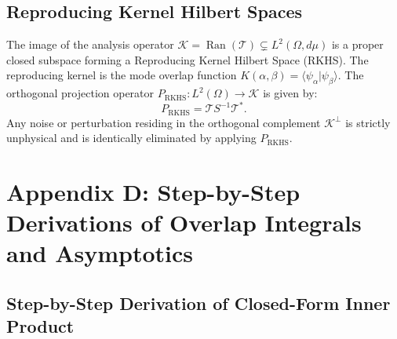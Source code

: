 \documentclass{optica-article}
\begin{document}
\subsection{Reproducing Kernel Hilbert Spaces}

The image of the analysis operator $\mathcal{K} = \operatorname{Ran}(\mathcal{T}) \subsetneq L^2(\Omega, d\mu)$ is a proper closed subspace forming a Reproducing Kernel Hilbert Space (RKHS). The reproducing kernel is the mode overlap function $K(\alpha, \beta) = \langle \psi_\alpha | \psi_\beta \rangle$. The orthogonal projection operator $P_{\text{RKHS}}: L^2(\Omega) \to \mathcal{K}$ is given by:
\begin{equation}
P_{\text{RKHS}} = \mathcal{T} S^{-1} \mathcal{T}^*.
\end{equation}
Any noise or perturbation residing in the orthogonal complement $\mathcal{K}^\perp$ is strictly unphysical and is identically eliminated by applying $P_{\text{RKHS}}$.

\section{Appendix D: Step-by-Step Derivations of Overlap Integrals and Asymptotics}
\label{app:derivations}

\subsection{Step-by-Step Derivation of Closed-Form Inner Product}
\end{document}

